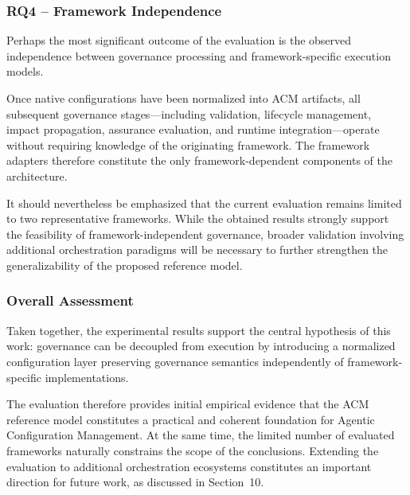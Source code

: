 \documentclass[10pt]{article}
\begin{document}
\subsubsection*{RQ4 -- Framework Independence}

Perhaps the most significant outcome of the evaluation is the observed independence between governance processing and framework-specific execution models.

Once native configurations have been normalized into ACM artifacts, all subsequent governance stages—including validation, lifecycle management, impact propagation, assurance evaluation, and runtime integration—operate without requiring knowledge of the originating framework. The framework adapters therefore constitute the only framework-dependent components of the architecture.

It should nevertheless be emphasized that the current evaluation remains limited to two representative frameworks. While the obtained results strongly support the feasibility of framework-independent governance, broader validation involving additional orchestration paradigms will be necessary to further strengthen the generalizability of the proposed reference model.

\subsubsection*{Overall Assessment}

Taken together, the experimental results support the central hypothesis of this work: governance can be decoupled from execution by introducing a normalized configuration layer preserving governance semantics independently of framework-specific implementations.

The evaluation therefore provides initial empirical evidence that the ACM reference model constitutes a practical and coherent foundation for Agentic Configuration Management. At the same time, the limited number of evaluated frameworks naturally constrains the scope of the conclusions. Extending the evaluation to additional orchestration ecosystems constitutes an important direction for future work, as discussed in Section~10.
\end{document}
